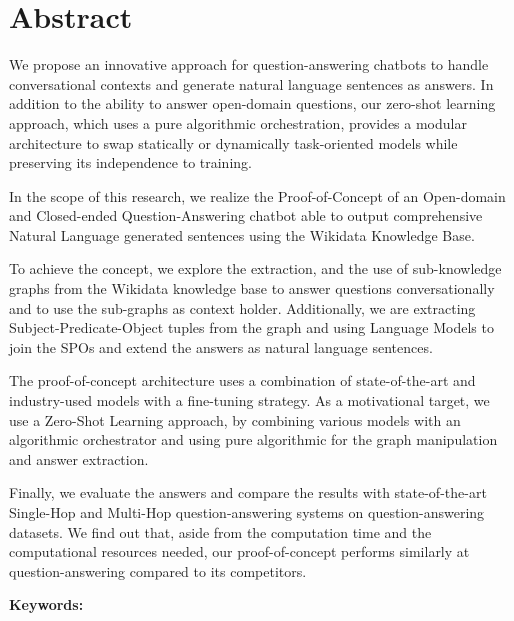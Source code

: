 \chapter*{Abstract}

We propose an innovative approach for question-answering chatbots to handle conversational contexts and generate natural language sentences as answers. In addition to the ability to answer open-domain questions, our zero-shot learning approach, which uses a pure algorithmic orchestration, provides a modular architecture to swap statically or dynamically task-oriented models while preserving its independence to training.

In the scope of this research, we realize the Proof-of-Concept of an Open-domain and Closed-ended Question-Answering chatbot able to output comprehensive Natural Language generated sentences using the Wikidata Knowledge Base. 

To achieve the concept, we explore the extraction, and the use of sub-knowledge graphs from the Wikidata knowledge base to answer questions conversationally and to use the sub-graphs as context holder. Additionally, we are extracting Subject-Predicate-Object tuples from the graph and using Language Models to join the SPOs and extend the answers as natural language sentences.

The proof-of-concept architecture uses a combination of state-of-the-art and industry-used models with a fine-tuning strategy. As a motivational target, we use a Zero-Shot Learning approach, by combining various models with an algorithmic orchestrator and using pure algorithmic for the graph manipulation and answer extraction.

Finally, we evaluate the answers and compare the results with state-of-the-art Single-Hop and Multi-Hop question-answering systems on question-answering datasets. We find out that, aside from the computation time and the computational resources needed, our proof-of-concept performs similarly at question-answering compared to its competitors. 

\vskip0.5cm
\textbf{Keywords:} 
\Keywords